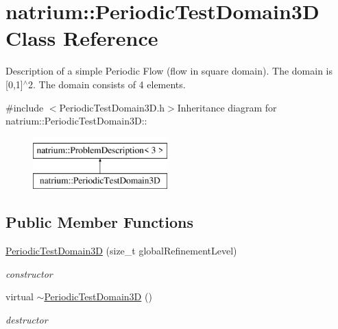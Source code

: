 \hypertarget{classnatrium_1_1PeriodicTestDomain3D}{
\section{natrium::PeriodicTestDomain3D Class Reference}
\label{classnatrium_1_1PeriodicTestDomain3D}
}


Description of a simple Periodic Flow (flow in square domain). The domain is \mbox{[}0,1\mbox{]}$^\wedge$2. The domain consists of 4 elements.  


{\ttfamily \#include $<$PeriodicTestDomain3D.h$>$}Inheritance diagram for natrium::PeriodicTestDomain3D::\begin{figure}[H]
\begin{center}
\leavevmode
\includegraphics[height=2cm]{classnatrium_1_1PeriodicTestDomain3D}
\end{center}
\end{figure}
\subsection*{Public Member Functions}
\begin{DoxyCompactItemize}
\item 
\hyperlink{classnatrium_1_1PeriodicTestDomain3D_a483fb92b4495d3ded8cf1a667b1c558f}{PeriodicTestDomain3D} (size\_\-t globalRefinementLevel)
\begin{DoxyCompactList}\small\item\em constructor \item\end{DoxyCompactList}\item 
\hypertarget{classnatrium_1_1PeriodicTestDomain3D_a513979522d7fb561bd581660eb5d68a1}{
virtual \hyperlink{classnatrium_1_1PeriodicTestDomain3D_a513979522d7fb561bd581660eb5d68a1}{$\sim$PeriodicTestDomain3D} ()}
\label{classnatrium_1_1PeriodicTestDomain3D_a513979522d7fb561bd581660eb5d68a1}

\begin{DoxyCompactList}\small\item\em destructor \item\end{DoxyCompactList}\end{DoxyCompactItemize}


